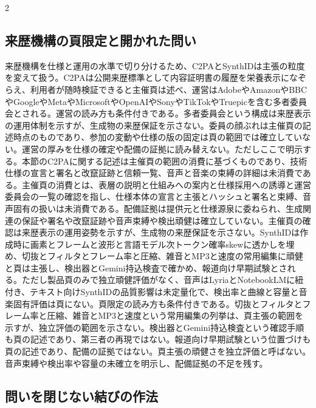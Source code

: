 \documentclass[lualatex,a4paper,10pt]{jlreq}
\begin{document}
\begin{multicols}{2}
\subsection{来歴機構の頁限定と開かれた問い}
来歴機構を仕様と運用の水準で切り分けるため、C2PAとSynthIDは主張の粒度を変えて扱う。C2PAは公開来歴標準として内容証明書の履歴を栄養表示になぞらえ、利用者が随時検証できると主催頁は述べ、運営はAdobeやAmazonやBBCやGoogleやMetaやMicrosoftやOpenAIやSonyやTikTokやTruepicを含む多者委員会とされる\autocite{btd098}。運営の読み方も条件付きである。多者委員会という構成は来歴表示の運用体制を示すが、生成物の来歴保証を示さない。委員の顔ぶれは主催頁の記述時点のものであり、参加の変動や仕様の版の固定は頁の範囲では確立していない。運営の厚みを仕様の確定や配備の証拠に読み替えない。ただしここで明示する。本節のC2PAに関する記述は主催頁の範囲の消費に基づくものであり、技術仕様の宣言と署名と改竄証跡と信頼一覧、音声と音楽の束縛の詳細は未消費である\autocite{btd098}。主催頁の消費とは、表層の説明と仕組みへの案内と仕様採用への誘導と運営委員会の一覧の確認を指し、仕様本体の宣言と主張とハッシュと署名と束縛、音声固有の扱いは未消費である。配備証拠は提供元と仕様源泉に委ねられ、生成関連の保証や署名や改竄証跡や音声束縛や検出頑健は確立していない\autocite{btd098}。主催頁の確認は来歴表示の運用姿勢を示すが、生成物の来歴保証を示さない。SynthIDは作成時に画素とフレームと波形と言語モデル次トークン確率skewに透かしを埋め、切抜とフィルタとフレーム率と圧縮、雑音とMP3と速度の常用編集に頑健と頁は主張し、検出器とGemini持込検査で確かめ、報道向け早期試験とされる\autocite{btd099}。ただし製品頁のみで独立頑健評価がなく、音声はLyriaとNotebookLMに紐付き、テキスト向けSynthIDの品質影響は未定量化で、検出率と曲線と容量と音楽固有評価は頁にない\autocite{btd099}。頁限定の読み方も条件付きである。切抜とフィルタとフレーム率と圧縮、雑音とMP3と速度という常用編集の列挙は、頁主張の範囲を示すが、独立評価の範囲を示さない。検出器とGemini持込検査という確認手順も頁の記述であり、第三者の再現ではない。報道向け早期試験という位置づけも頁の記述であり、配備の証拠ではない\autocite{btd099}。頁主張の頑健さを独立評価と呼ばない。音声束縛や検出率や容量の未確立を明示し、配備証拠の不足を残す\autocite{btd098,btd099}。\subsection{問いを閉じない結びの作法}

\end{multicols}
\end{document}
